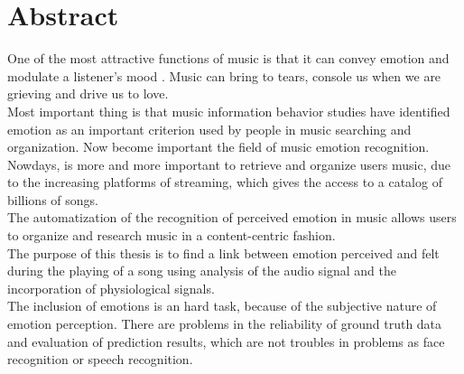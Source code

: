 \chapter{Abstract}
\label{Abstract}
\thispagestyle{empty}

\indent One of the most attractive functions of music is that it can convey emotion and modulate a listener's mood \cite{feng2003popular}. Music can bring to tears, console us when we are grieving and drive us to love.
\\
Most important thing is that music information behavior studies have identified emotion as an important criterion used by people in music searching and organization. Now become important the field of music emotion recognition.
\\ \indent
Nowdays, is more and more important to retrieve and organize users music, due to the increasing platforms of streaming, which gives the access to a catalog of billions of songs.
\\
The automatization of the recognition of perceived emotion in music allows users to organize and research music in a content-centric fashion.
\\ \indent
The purpose of this thesis is to find a link between emotion perceived and felt during the playing of a song using  analysis of the audio signal and the incorporation of physiological signals.
\\ \indent
The inclusion of emotions is an hard task, because of the subjective nature of emotion perception. There are problems in the reliability of ground truth data and evaluation of prediction results, which are not troubles in problems as face recognition or speech recognition.